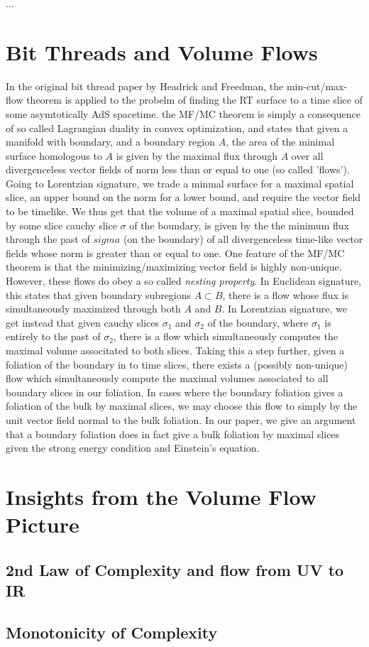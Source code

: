\documentclass[12pt]{amsart}
\begin{document}
...

\section{Bit Threads and Volume Flows}

In the original bit thread paper by Headrick and Freedman, the min-cut/max-flow theorem is applied to the probelm of finding the RT surface to a time slice of some asymtotically AdS spacetime. the MF/MC theorem is simply a consequence of so called Lagrangian duality in convex optimization, and states that given a manifold with boundary, and a boundary region $A$, the area of the minimal surface homologous to $A$ is given by the maximal flux through $A$ over all divergenceless vector fields of norm less than or equal to one (so called 'flows'). Going to Lorentzian signature, we trade a minmal surface for a maximal spatial slice, an upper bound on the norm for a lower bound, and require the vector field to be timelike. We thus get that the volume of a maximal spatial slice, bounded by some slice cauchy slice $\sigma$ of the boundary, is given by the the minimum flux through the past of $sigma$ (on the boundary) of all divergenceless time-like vector fields whose norm is greater than or equal to one. One feature of the MF/MC theorem is that the minimizing/maximizing vector field is highly non-unique. However, these flows do obey a so called {\it nesting property}. In Euclidean signature, this states that given boundary subregions $A \subset B$, there is a flow whose flux is simultaneously maximized through both $A$ and $B$. In Lorentzian signature, we get instead that given cauchy slices $\sigma_1$ and $\sigma_2$ of the boundary, where $\sigma_1$ is entirely to the past of $\sigma_2$, there is a flow which simultaneously computes the maximal volume associtated to both slices. Taking this a step further, given a foliation of the boundary in to time slices, there exists a (possibly non-unique) flow which simultaneously  compute the maximal volumes associated to all boundary slices in our foliation. In cases where the boundary foliation gives a foliation of the bulk by maximal slices, we may choose this flow to simply by the unit vector field normal to the bulk foliation. In our paper, we give an argument that a boundary foliation does in fact give a bulk foliation by maximal slices given the strong energy condition and Einstein's equation.

\section{Insights from the Volume Flow Picture}

\subsection{2nd Law of Complexity and flow from UV to IR}

\subsection{Monotonicity of Complexity}
\end{document}
